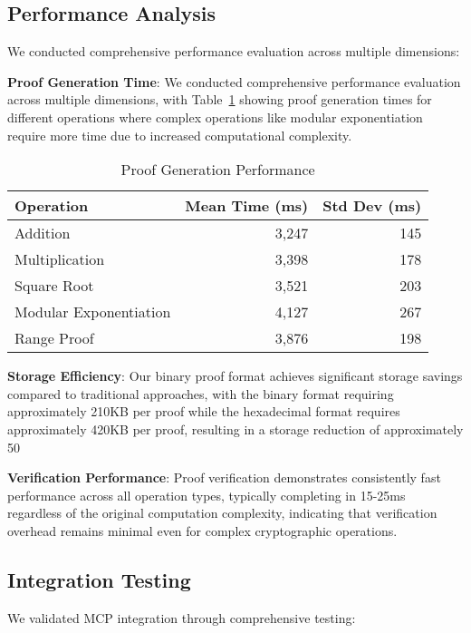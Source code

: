 \documentclass[11pt]{article}
\begin{document}
\subsection{Performance Analysis}

We conducted comprehensive performance evaluation across multiple dimensions:

\textbf{Proof Generation Time}: We conducted comprehensive performance evaluation across multiple dimensions, with Table~\ref{tab:performance} showing proof generation times for different operations where complex operations like modular exponentiation require more time due to increased computational complexity.

\begin{table}[ht]
\centering
\caption{Proof Generation Performance}
\label{tab:performance}
\begin{tabular}{lrr}
\toprule
Operation & Mean Time (ms) & Std Dev (ms) \\
\midrule
Addition & 3,247 & 145 \\
Multiplication & 3,398 & 178 \\
Square Root & 3,521 & 203 \\
Modular Exponentiation & 4,127 & 267 \\
Range Proof & 3,876 & 198 \\
\bottomrule
\end{tabular}
\end{table}

\textbf{Storage Efficiency}: Our binary proof format achieves significant storage savings compared to traditional approaches, with the binary format requiring approximately 210KB per proof while the hexadecimal format requires approximately 420KB per proof, resulting in a storage reduction of approximately 50%

\textbf{Verification Performance}: Proof verification demonstrates consistently fast performance across all operation types, typically completing in 15-25ms regardless of the original computation complexity, indicating that verification overhead remains minimal even for complex cryptographic operations.

\subsection{Integration Testing}

We validated MCP integration through comprehensive testing:
\end{document}
